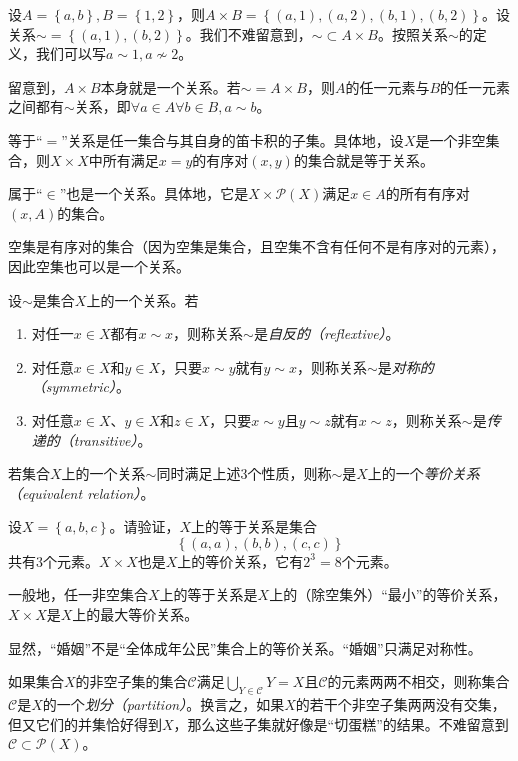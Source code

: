 \documentclass[main.tex]{subfiles}
\begin{document}
\begin{example}
设$A=\left\{a,b\right\}, B=\left\{1,2\right\}$，则$A\times B=\left\{\left(a,1\right),\left(a,2\right),\left(b,1\right),\left(b,2\right)\right\}$。设关系$\sim=\left\{\left(a,1\right),\left(b,2\right)\right\}$。我们不难留意到，$\sim\subset A\times B$。按照关系$\sim$的定义，我们可以写$a\sim 1,a\not\sim 2$。

留意到，$A\times B$本身就是一个关系。若$\sim=A\times B$，则$A$的任一元素与$B$的任一元素之间都有$\sim$关系，即$\forall a\in A\forall b\in B,a\sim b$。

等于“$=$”关系是任一集合与其自身的笛卡积的子集。具体地，设$X$是一个非空集合，则$X\times X$中所有满足$x=y$的有序对$\left(x,y\right)$的集合就是等于关系。

属于“$\in$”也是一个关系。具体地，它是$X\times\mathcal{P}\left(X\right)$满足$x\in A$的所有有序对$\left(x,A\right)$的集合。

空集是有序对的集合（因为空集是集合，且空集不含有任何不是有序对的元素），因此空集也可以是一个关系。
\end{example}

设$\sim$是集合$X$上的一个关系。若
\begin{enumerate}
    \item 对任一$x\in X$都有$x\sim x$，则称关系$\sim$是\emph{自反的（reflextive）}。
    \item 对任意$x\in X$和$y\in X$，只要$x\sim y$就有$y\sim x$，则称关系$\sim$是\emph{对称的（symmetric）}。
    \item 对任意$x\in X$、$y\in X$和$z\in X$，只要$x\sim y\text{且}y\sim z$就有$x\sim z$，则称关系$\sim$是\emph{传递的（transitive）}。
\end{enumerate}
若集合$X$上的一个关系$\sim$同时满足上述3个性质，则称$\sim$是$X$上的一个\emph{等价关系（equivalent relation）}。

\begin{example}
设$X=\left\{a,b,c\right\}$。请验证，$X$上的等于关系是集合
\[
\left\{\left(a,a\right),\left(b,b\right),\left(c,c\right)\right\}
\]
共有3个元素。$X\times X$也是$X$上的等价关系，它有$2^3=8$个元素。

一般地，任一非空集合$X$上的等于关系是$X$上的（除空集外）“最小”的等价关系，$X\times X$是$X$上的最大等价关系。

显然，“婚姻”不是“全体成年公民”集合上的等价关系。“婚姻”只满足对称性。
\end{example}

如果集合$X$的非空子集的集合$\mathcal{C}$满足$\bigcup_{Y\in\mathcal{C}}Y=X$且$\mathcal{C}$的元素两两不相交，则称集合$\mathcal{C}$是$X$的一个\emph{划分（partition）}。换言之，如果$X$的若干个非空子集两两没有交集，但又它们的并集恰好得到$X$，那么这些子集就好像是“切蛋糕”的结果。不难留意到$\mathcal{C}\subset\mathcal{P}\left(X\right)$。
\end{document}
